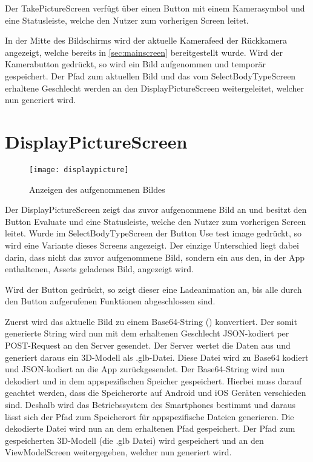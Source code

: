 Der TakePictureScreen verfügt über einen Button mit einem Kamerasymbol und eine Statusleiste, welche den Nutzer zum vorherigen Screen leitet.

In der Mitte des Bildschirms wird der aktuelle Kamerafeed der Rückkamera angezeigt, welche bereits in \ref{sec:mainscreen} bereitgestellt wurde. Wird der Kamerabutton gedrückt, 
so wird ein Bild aufgenommen und temporär gespeichert. Der Pfad zum aktuellen Bild und das vom SelectBodyTypeScreen erhaltene Geschlecht werden an den DisplayPictureScreen weitergeleitet, 
welcher nun generiert wird.

\clearpage
\section{DisplayPictureScreen}
\label{sec:displaypicture}
\begin{figure}[htpb]
    \centering
    \texttt{[image: displaypicture]}
    \caption{Anzeigen des aufgenommenen Bildes}
    \label{img:displaypicture}
\end{figure}

Der DisplayPictureScreen zeigt das zuvor aufgenommene Bild an und besitzt den Button \glqq{}Evaluate\grqq{} und eine Statusleiste, welche den Nutzer zum vorherigen Screen leitet. \newline
Wurde im SelectBodyTypeScreen der Button \glqq{}Use test image\grqq{} gedrückt, so wird eine Variante dieses Screens angezeigt. Der einzige Unterschied liegt dabei darin, dass nicht 
das zuvor aufgenommene Bild, sondern ein aus den, in der App enthaltenen, Assets geladenes Bild, angezeigt wird.

Wird der Button gedrückt, so zeigt dieser eine Ladeanimation an, bis alle durch den Button aufgerufenen Funktionen abgeschlossen sind.

Zuerst wird das aktuelle Bild zu einem Base64-String (\cite{misc:base64}) konvertiert. Der somit generierte String wird nun mit dem erhaltenen Geschlecht JSON-kodiert per POST-Request an den Server 
gesendet. Der Server wertet die Daten aus und generiert daraus ein 3D-Modell als .glb-Datei. Diese Datei wird zu Base64 kodiert und JSON-kodiert an die App zurückgesendet. \newline
Der Base64-String wird nun dekodiert und in dem appspezifischen Speicher gespeichert. Hierbei muss darauf geachtet werden, dass die Speicherorte auf Android und iOS Geräten 
verschieden sind. Deshalb wird das Betriebssystem des Smartphones bestimmt und daraus lässt sich der Pfad zum Speicherort für appspezifische Dateien generieren. Die dekodierte Datei 
wird nun an dem erhaltenen Pfad gespeichert. \newline
Der Pfad zum gespeicherten 3D-Modell (die .glb Datei) wird gespeichert und an den ViewModelScreen weitergegeben, welcher nun generiert wird.

